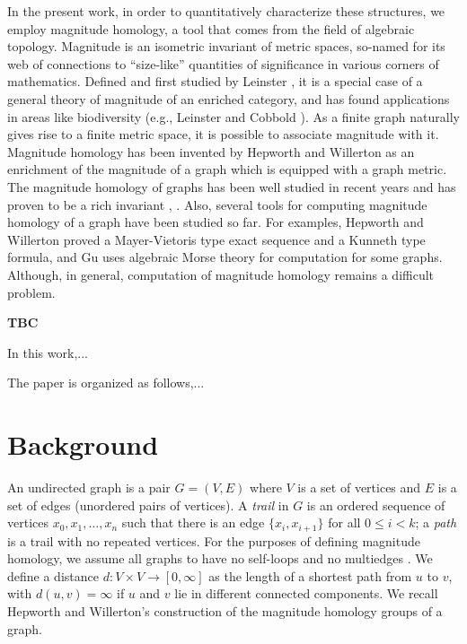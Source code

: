 \documentclass[runningheads]{llncs}
\begin{document}
In the present work, in order to quantitatively characterize these structures, we employ magnitude homology, a tool that comes from the field of algebraic topology.
Magnitude is an isometric invariant of metric spaces, so-named for its web of connections to ``size-like'' quantities of significance in various corners of mathematics.
Defined and first studied by Leinster \cite{leinster2013magnitude}, it is a special case of a general theory of magnitude of an enriched category, and has found applications in areas like biodiversity (e.g., Leinster and Cobbold \cite{leinster2012measuring}).
As a finite graph naturally gives rise to a finite metric space, it is possible to associate magnitude with it.
Magnitude homology has been invented by Hepworth and Willerton \cite{hepworth2015categorifying} as an enrichment of the magnitude of a graph which is equipped with a graph metric.
The magnitude homology of graphs has been well studied in recent years and has proven to be a rich invariant \cite{hepworth2015categorifying} \cite{gu2018graph}, \cite{sazdanovic2021torsion}.
Also, several tools for computing magnitude homology of a graph have been studied so far. 
For examples, Hepworth and Willerton proved a Mayer-Vietoris type exact sequence and a Kunneth type formula, and Gu \cite{gu2018graph} uses algebraic Morse theory for computation for some graphs. 
Although, in general, computation of magnitude homology remains a difficult problem.

\textbf{TBC}

In this work,...

The paper is organized as follows,...

\section{Background}

An undirected graph is a pair $G=(V,E)$ where $V$ is a set of vertices and $E$ is a set of edges (unordered pairs of vertices). A \emph{trail} in $G$ is an ordered sequence of vertices $x_0,x_1,\ldots,x_n$ such that there is an edge $\{x_i,x_{i+1}\}$ for all $0\leq i<k$; a \emph{path} is a trail with no repeated vertices.
For the purposes of defining magnitude homology, we assume all graphs to have no self-loops and no multiedges \cite{leinster2019magnitude}.
We define a distance $d:V \times V \to [0,\infty]$ as the length of a shortest path from $u$ to $v$, with $d(u,v) = \infty$ if $u$ and $v$ lie in different connected components.
%
We recall Hepworth and Willerton's construction \cite{hepworth2015categorifying} of the magnitude homology groups of a graph.
\end{document}
